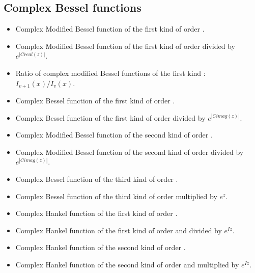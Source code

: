 \subsection{Complex Bessel functions}

\begin{itemize}
\item {}
  \sshortdescribe  Complex Modified Bessel function of the first
  kind of order .
\item {}
  \sshortdescribe  Complex Modified Bessel function of the first
  kind of order  divided by $e^{|Creal(z)|}$.
\item {}
  \sshortdescribe Ratio of complex modified Bessel functions of the first kind : $I_{v+1}(x) /
  I_v (x)$.
\item {}
  \sshortdescribe  Complex  Bessel function of the first
  kind of order .
\item {}
  \sshortdescribe  Complex  Bessel function of the first
  kind of order  divided by $e^{|Cimag(z)|}$.
\item {}
  \sshortdescribe  Complex Modified Bessel function of the second
  kind of order .
\item {}
  \sshortdescribe  Complex Modified Bessel function of the second
  kind of order  divided by $e^{|Cimag(z)|}$.
\item {}
  \sshortdescribe  Complex Bessel function of the third
  kind of order .
\item {}
  \sshortdescribe  Complex Bessel function of the third
  kind of order  multiplied by $e^{z}$.
\item {}
  \sshortdescribe  Complex Hankel function of the first kind of
  order . 
\item {}
  \sshortdescribe  Complex  Hankel function of the first kind of order
    and divided by $e^{I z}$.
\item {}
  \sshortdescribe  Complex  Hankel function of the second kind of
  order . 
\item {}
  \sshortdescribe  Complex  Hankel function of the second kind of
  order   and multiplied by $e^{I z}$.
\end{itemize}

